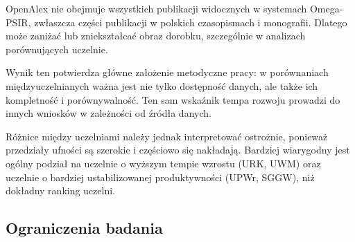 \documentclass[
  polish,
  12pt,
  a4paper,
]{article}
\begin{document}
OpenAlex nie obejmuje wszystkich publikacji widocznych w systemach
Omega-PSIR, zwłaszcza części publikacji w polskich czasopismach i
monografii. Dlatego może zaniżać lub zniekształcać obraz dorobku,
szczególnie w analizach porównujących uczelnie.

Wynik ten potwierdza główne założenie metodyczne pracy: w porównaniach
międzyuczelnianych ważna jest nie tylko dostępność danych, ale także ich
kompletność i porównywalność. Ten sam wskaźnik tempa rozwoju prowadzi do
innych wniosków w zależności od źródła danych.

Różnice między uczelniami należy jednak interpretować ostrożnie,
ponieważ przedziały ufności są szerokie i częściowo się nakładają.
Bardziej wiarygodny jest ogólny podział na uczelnie o wyższym tempie
wzrostu (URK, UWM) oraz uczelnie o bardziej ustabilizowanej
produktywności (UPWr, SGGW), niż dokładny ranking uczelni.

\subsection{Ograniczenia badania}\label{ograniczenia-badania}
\end{document}
